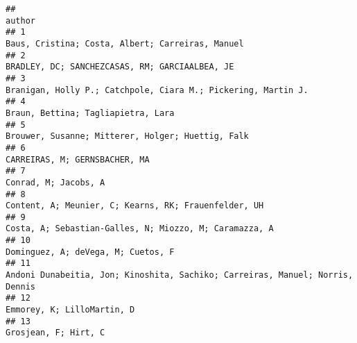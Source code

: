 \documentclass[
  english,
  man]{apa6}
\begin{document}
\begin{verbatim}
##                                                                                                                                                                                       author
## 1                                                                                                                                           Baus, Cristina; Costa, Albert; Carreiras, Manuel
## 2                                                                                                                                             BRADLEY, DC; SANCHEZCASAS, RM; GARCIAALBEA, JE
## 3                                                                                                                              Branigan, Holly P.; Catchpole, Ciara M.; Pickering, Martin J.
## 4                                                                                                                                                         Braun, Bettina; Tagliapietra, Lara
## 5                                                                                                                                          Brouwer, Susanne; Mitterer, Holger; Huettig, Falk
## 6                                                                                                                                                              CARREIRAS, M; GERNSBACHER, MA
## 7                                                                                                                                                                       Conrad, M; Jacobs, A
## 8                                                                                                                                       Content, A; Meunier, C; Kearns, RK; Frauenfelder, UH
## 9                                                                                                                                     Costa, A; Sebastian-Galles, N; Miozzo, M; Caramazza, A
## 10                                                                                                                                                        Dominguez, A; deVega, M; Cuetos, F
## 11                                                                                                             Andoni Dunabeitia, Jon; Kinoshita, Sachiko; Carreiras, Manuel; Norris, Dennis
## 12                                                                                                                                                                Emmorey, K; LilloMartin, D
## 13                                                                                                                                                                      Grosjean, F; Hirt, C

\end{verbatim}
\end{document}
